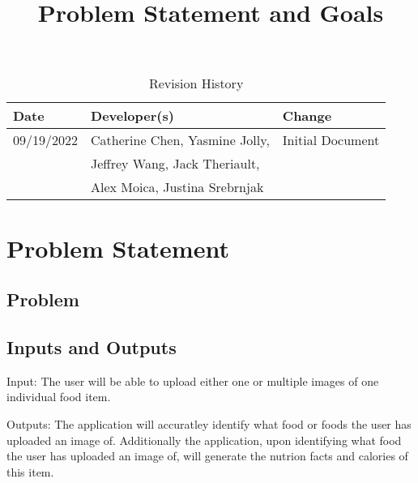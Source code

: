 \documentclass{article}
\title{Problem Statement and Goals\\\progname}
\author{\authname}
\date{}
\begin{document}
\maketitle

\begin{table}[hp]
\caption{Revision History} \label{TblRevisionHistory}
\begin{tabularx}{\textwidth}{llX}
\toprule
\textbf{Date} & \textbf{Developer(s)} & \textbf{Change}\\
\midrule
09/19/2022 & Catherine Chen, Yasmine Jolly, &Initial Document\\ 
&Jeffrey Wang, Jack Theriault, &\\
&Alex Moica, Justina Srebrnjak &\\
\bottomrule
\end{tabularx}
\end{table}

\section{Problem Statement}


\subsection{Problem}

\subsection{Inputs and Outputs}


Input:
The user will be able to upload either one or multiple images of one individual food item.

Outputs:
The application will accuratley identify what food or foods the user has uploaded an image of. Additionally the application, upon identifying what food the user has uploaded an image of, will generate the nutrion facts and calories of this item.
\end{document}
